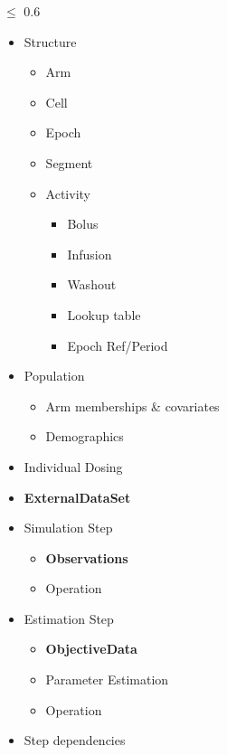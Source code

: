 \begin{minipage}{0.35\textwidth}
\small
\centering 
\pml $\le$ 0.6\\
{\color{red} \scshape{}}
\begin{flushleft} 
\begin{itemize}
\item 
Structure
\begin{itemize}
\item
Arm
\item
Cell
\item
Epoch
\item
Segment
\item
Activity
\begin{itemize}
\item
Bolus
\item
Infusion
\item
Washout
\item
Lookup table
\item
Epoch Ref/Period
\end{itemize}
\end{itemize}
\item
Population
\begin{itemize}
\item
Arm memberships \& covariates
\item
Demographics
\end{itemize}
\item 
Individual Dosing
\end{itemize}
\vspace{2em}
\end{flushleft}
\centering 
{\color{red} \scshape{}}
\begin{flushleft} 
\begin{itemize}
\item 
\textbf{ExternalDataSet}
\item 
Simulation Step
\begin{itemize}
\item 
\textbf{Observations}
\item 
Operation
\end{itemize}
\item 
Estimation Step
\begin{itemize}
\item 
\textbf{ObjectiveData}
\item 
Parameter Estimation
\item 
Operation
\end{itemize}
\item 
Step dependencies
\end{itemize}
\end{flushleft}
\end{minipage}
